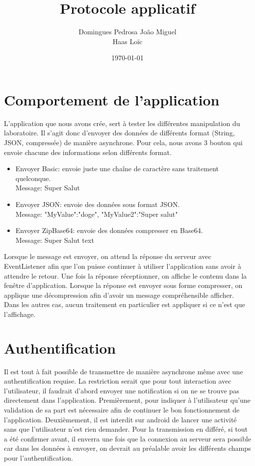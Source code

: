 \documentclass[10pt,a4paper]{article}
\author{Domingues Pedrosa João Miguel \\ Haas Loïc}
\title{Protocole applicatif}
\date{\today}
\begin{document}
\maketitle
\newpage
\tableofcontents
\newpage

\section{Comportement de l'application}

L'application que nous avons crée, sert à tester les différentes manipulation du laboratoire.
Il s'agit donc d'envoyer des données de différents format (String, JSON, compressée) de manière asynchrone. 
Pour cela, nous avons 3 bouton qui envoie chacune des informations selon différents format.\\
\begin{itemize}
	\item Envoyer Basic: envoie juste une chaîne de caractère sans traitement quelconque. \\Message: Super Salut\\
	\item Envoyer JSON: envoie des données sous format JSON. \\Message: "MyValue":"doge", "MyValue2":"Super salut"\\
	\item Envoyer ZipBase64: envoie des données compresser en Base64. \\Message: Super Salut text\\
\end{itemize} 
Lorsque le message est envoyer, on attend la réponse du serveur avec EventListener afin que l'on puisse continuer à utiliser l'application sans avoir à attendre le retour. Une fois la réponse réceptionner, on affiche le contenu dans la fenêtre d'application. Lorsque la réponse est envoyer sous forme compresser, on applique une décompression afin d'avoir un message compréhensible afficher. Dans les autres cas, aucun traitement en particulier est appliquer si ce n'est que l'affichage.

\section{Authentification}
Il est tout à fait possible de transmettre de manière asynchrone même avec une authentification requise.
La restriction serait que pour tout interaction avec l'utilisateur, il faudrait d'abord envoyer une notification si on ne se trouve pas directement dans l'application.
Premièrement, pour indiquer à l'utilisateur qu'une validation de sa part est nécessaire afin de continuer le bon fonctionnement de l'application. Deuxièmement, il est interdit sur android de lancer une activité sans que l'utilisateur n'est rien demander.
Pour la transmission en différé, si tout a été confirmer avant, il enverra une fois que la connexion au serveur sera possible car dans les données à envoyer, on devrait au préalable avoir les différents champs pour l'authentification.
\end{document}
